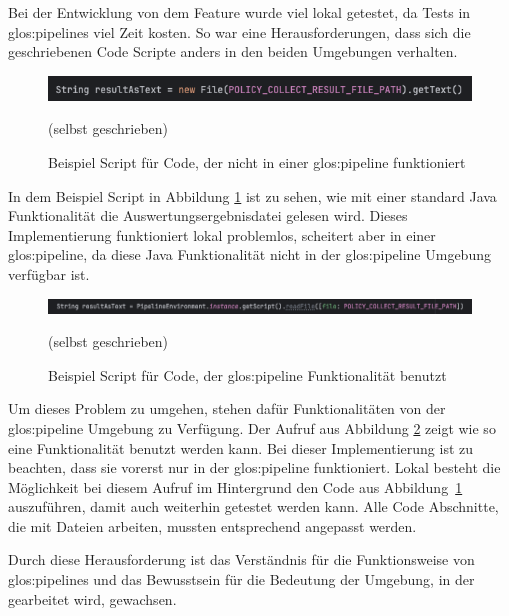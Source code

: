 \documentclass[../main.tex]{subfiles}
\begin{document}
Bei der Entwicklung von dem Feature wurde viel lokal getestet, da Tests in \glspl{glos:pipeline} viel Zeit kosten.
So war eine Herausforderungen, dass sich die geschriebenen Code Scripte anders in den beiden Umgebungen verhalten.

\begin{figure}[ht]
    \centering
    \includegraphics[scale=0.45]{bilder/codebad.png}
    \caption{Beispiel Script für Code, der nicht in einer \gls{glos:pipeline} funktioniert}
    \footnotesize (selbst geschrieben)
    \label{fig:codebad}
\end{figure}


In dem Beispiel Script in Abbildung \ref{fig:codebad} ist zu sehen, wie mit einer standard Java Funktionalität die Auswertungsergebnisdatei gelesen wird.
Dieses Implementierung funktioniert lokal problemlos, scheitert aber in einer \gls{glos:pipeline}, da diese Java Funktionalität nicht in der \gls{glos:pipeline} Umgebung verfügbar ist.

\begin{figure}[ht]
    \centering
    \includegraphics[scale=0.45]{bilder/codegood.png}
    \caption{Beispiel Script für Code, der \gls{glos:pipeline} Funktionalität benutzt}
    \footnotesize (selbst geschrieben)
    \label{fig:codegood}
\end{figure}
        
Um dieses Problem zu umgehen, stehen dafür Funktionalitäten von der \gls{glos:pipeline} Umgebung zu Verfügung.
Der Aufruf aus Abbildung \ref{fig:codegood} zeigt wie so eine Funktionalität benutzt werden kann.
Bei dieser Implementierung ist zu beachten, dass sie vorerst nur in der \gls{glos:pipeline} funktioniert.
Lokal besteht die Möglichkeit bei diesem Aufruf im Hintergrund den Code aus Abbildung \ref{fig:codebad} auszuführen, damit auch weiterhin getestet werden kann.
Alle Code Abschnitte, die mit Dateien arbeiten, mussten entsprechend angepasst werden.

Durch diese Herausforderung ist das Verständnis für die Funktionsweise von \glspl{glos:pipeline} und das Bewusstsein für die Bedeutung der Umgebung, in der gearbeitet wird, gewachsen.
\end{document}
